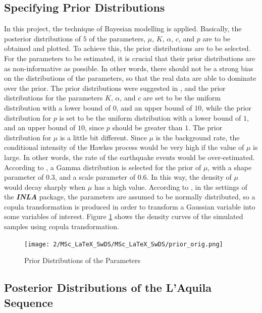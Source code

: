 \documentclass[11pt,twoside]{article}
\numberwithin{Theorem}{section}
\numberwithin{Definition}{section}
\numberwithin{Lemma}{section}
\numberwithin{Algorithm}{section}
\numberwithin{equation}{section}
\begin{document}
\subsection{Specifying Prior Distributions}
\label{subsec:prior}
In this project, the technique of Bayesian modelling is applied. Basically, the posterior distributions of $5$ of the parameters, $\mu$, $K$, $\alpha$, $c$, and $p$ are to be obtained and plotted. To achieve this, the prior distributions are to be selected. For the parameters to be estimated, it is crucial that their prior distributions are as non-informative as possible. In other words, there should not be a strong bias on the distributions of the parameters, so that the real data are able to dominate over the prior. The prior distributions were suggested in \cite{edinburghseismicityhubTemporalModeld}, and the prior distributions for the parameters $K$, $\alpha$, and $c$ are set to be the uniform distribution with a lower bound of $0$, and an upper bound of $10$, while the prior distribution for $p$ is set to be the uniform distribution with a lower bound of $1$, and an upper bound of $10$, since $p$ should be greater than $1$. The prior distribution for $\mu$ is a little bit different. Since $\mu$ is the background rate, the conditional intensity of the Hawkes process would be very high if the value of $\mu$ is large. In other words, the rate of the earthquake events would be over-estimated. According to \cite{naylor2023bayesian}, a Gamma distribution is selected for the prior of $\mu$, with a shape parameter of $0.3$, and a scale parameter of $0.6$. In this way, the density of $\mu$ would decay sharply when $\mu$ has a high value. According to \cite{naylor2023bayesian}, in the settings of the \textit{\textbf{INLA}} package, the parameters are assumed to be normally distributed, so a copula transformation is produced in order to transform a Gaussian variable into some variables of interest. Figure \ref{fig:prior_orig} shows the density curves of the simulated samples using copula transformation.
\begin{figure}[H]
\centering
\texttt{[image: 2/MSc\_LaTeX\_SwDS/MSc\_LaTeX\_SwDS/prior\_orig.png]}
\caption{Prior Distributions of the Parameters}
\label{fig:prior_orig}
\end{figure}

\subsection{Posterior Distributions of the L'Aquila Sequence}
\end{document}
